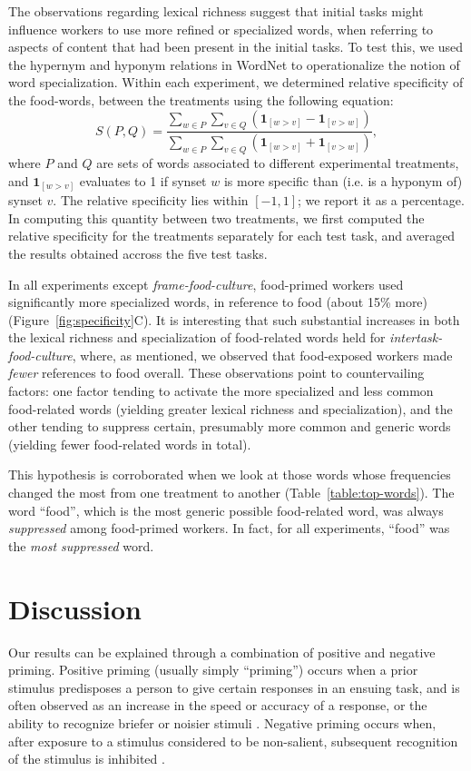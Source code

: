 \documentclass{sigchi}
\begin{document}
The observations regarding lexical richness suggest that 
initial tasks might influence workers to use more refined or specialized 
words, when referring to aspects of content that had been present in the 
initial tasks.  
To test this, we used the hypernym and hyponym relations in WordNet 
to operationalize the notion of word specialization.  
Within each experiment, we determined relative specificity
of the food-words, between the treatments using the following equation:
\begin{equation}
	S(P,Q) = \frac{
		\sum_{w\in P}\sum_{v\in Q} \left(
			\mathbf{1}_{[w>v]} - \mathbf{1}_{[v>w]} \right)
	}{
		\sum_{w\in P}\sum_{v\in Q} \left(
			\mathbf{1}_{[w>v]} + \mathbf{1}_{[v>w]} \right)
	},
\end{equation}
where $P$ and $Q$ are sets of words associated to different experimental 
treatments, and $\mathbf{1}_{[w>v]}$ evaluates
to 1 if synset $w$ is more specific than (i.e. is a hyponym of) synset $v$.
The relative specificity lies within $[-1,1]$; 
we report it as a percentage.
In computing this quantity between two treatments, we first computed the 
relative specificity for the treatments separately for each test task, and 
averaged the results obtained accross the five test tasks.

In all experiments except \textit{frame-food-culture}, food-primed workers 
used significantly more specialized words, in reference to food 
(about 15\% more) (Figure~\ref{fig:specificity}C).
It is interesting that such substantial increases in both the lexical 
richness and specialization of food-related words 
held for \textit{intertask-food-culture}, where, as mentioned, we observed 
that food-exposed workers made \textit{fewer} references to food overall. 
These observations point 
to countervailing factors: one factor tending to activate the more 
specialized and less common food-related words 
(yielding greater lexical richness and specialization), and the other tending 
to suppress certain, presumably more common and generic words 
(yielding fewer food-related words in total).

This hypothesis is corroborated when we look at those words whose 
frequencies changed the most from one treatment to another 
(Table~\ref{table:top-words}).  
The word ``food'', which is the most generic possible food-related word, was 
always \textit{suppressed} among food-primed workers.  In fact, 
for all experiments, ``food'' was the \textit{most suppressed} word.

\section{Discussion}
Our results can be 
explained through a combination of positive and negative priming.
Positive priming (usually simply ``priming'') occurs when a prior stimulus 
predisposes a person to give certain responses in an ensuing task, and
is often observed as an increase in the speed or accuracy of a response, or
the ability to recognize briefer or noisier stimuli 
\cite{BJOP1796,BJOP1826,Huber2008324}.
Negative priming occurs when, after exposure to a stimulus 
considered to be non-salient, subsequent recognition of the stimulus is 
inhibited \cite{mayr2007negative}.
\end{document}
